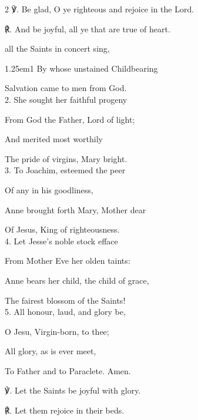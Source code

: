 \begin{paracol}{2}
℣. Be glad, O ye righteous and rejoice in the Lord.

℟. And be joyful, all ye that are true of heart.



\switchcolumn

\secondEvensong
{}

\secondEvensongHymn
{} all the Saints in concert sing,


\begin{hangparas}{1.25em}{1}
By whose unstained Childbearing

Salvation came to men from God.\\

2. She sought her faithful progeny

From God the Father, Lord of light;

And merited most worthily

The pride of virgins, Mary bright.\\

3. To Joachim, esteemed the peer

Of any in his goodliness,

Anne brought forth Mary, Mother dear

Of Jesus, King of righteousness.\\

4. Let Jesse's noble stock efface

From Mother Eve her olden taints:

Anne bears her child, the child of grace,

The fairest blossom of the Saints!\\

5. All honour, laud, and glory be,

O Jesu, Virgin-born, to thee;

All glory, as is ever meet,

To Father and to Paraclete. Amen.\\
\end{hangparas}

℣. Let the Saints be joyful with glory.

℟. Let them rejoice in their beds.


\fussy	
\end{paracol}

